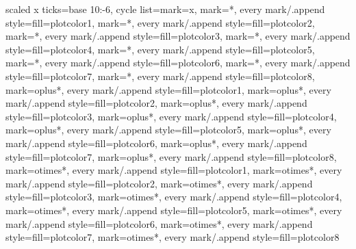\documentclass[a4paper]{article}
\begin{document}
\pgfplotsset
{scaled x ticks=base 10:-6,
 cycle list={{mark=x},
             {mark=*, every mark/.append style={fill=plotcolor1}}, {mark=*, every mark/.append style={fill=plotcolor2}},
             {mark=*, every mark/.append style={fill=plotcolor3}}, {mark=*, every mark/.append style={fill=plotcolor4}},
             {mark=*, every mark/.append style={fill=plotcolor5}}, {mark=*, every mark/.append style={fill=plotcolor6}},
             {mark=*, every mark/.append style={fill=plotcolor7}}, {mark=*, every mark/.append style={fill=plotcolor8}},
             {mark=oplus*, every mark/.append style={fill=plotcolor1}}, {mark=oplus*, every mark/.append style={fill=plotcolor2}},
             {mark=oplus*, every mark/.append style={fill=plotcolor3}}, {mark=oplus*, every mark/.append style={fill=plotcolor4}},
             {mark=oplus*, every mark/.append style={fill=plotcolor5}}, {mark=oplus*, every mark/.append style={fill=plotcolor6}},
             {mark=oplus*, every mark/.append style={fill=plotcolor7}}, {mark=oplus*, every mark/.append style={fill=plotcolor8}},
             {mark=otimes*, every mark/.append style={fill=plotcolor1}}, {mark=otimes*, every mark/.append style={fill=plotcolor2}},
             {mark=otimes*, every mark/.append style={fill=plotcolor3}}, {mark=otimes*, every mark/.append style={fill=plotcolor4}},
             {mark=otimes*, every mark/.append style={fill=plotcolor5}}, {mark=otimes*, every mark/.append style={fill=plotcolor6}},
             {mark=otimes*, every mark/.append style={fill=plotcolor7}}, {mark=otimes*, every mark/.append style={fill=plotcolor8}}}
}
\end{document}
